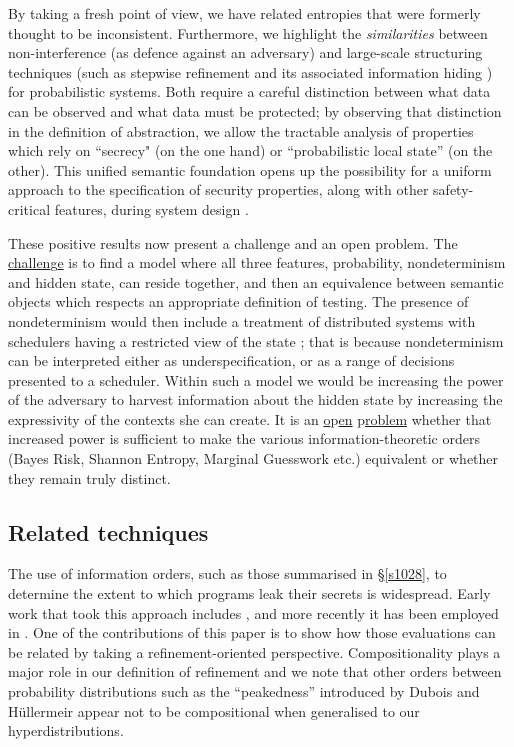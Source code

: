 \documentclass[runningheads]{llncs}
\newcommand\Sec[1] {Sec.~\ref{#1}}
\renewcommand\Sec[1] {\S\ref{#1}}
\begin{document}
By taking a fresh point of view, we have related entropies that were formerly thought to be inconsistent.
Furthermore, we highlight the \emph{similarities} between non-interference (as defence against an adversary) and large-scale structuring techniques (such as stepwise refinement and its associated information hiding \cite{Parnas:72}) for probabilistic systems. Both require a careful distinction between what data can be observed and what data must be protected; by observing that distinction in the definition of abstraction, we allow the tractable analysis of properties which rely on ``secrecy" (on the one hand) or ``probabilistic local state'' (on the other). This unified semantic foundation opens up the possibility for a uniform approach to the specification of security properties, along with other safety-critical features, during system design \cite{McIver:09f}.

These positive results now present a challenge and an open problem. The \underline{challen}g\underline{e} is to find a model where all three features, probability, nondeterminism and hidden state, can reside together, and then an equivalence between semantic objects which respects an appropriate definition of testing. The presence of nondeterminism would then include a treatment of distributed systems with schedulers having a restricted view of the state \cite{Chatzikokolakis:10}; that is because nondeterminism can be interpreted either as underspecification, or as a range of decisions presented to a scheduler.  Within such a model we would be increasing the power of the adversary  to harvest information about the hidden state by increasing the expressivity of the contexts she can create. It is an \underline{o}p\underline{en} p\underline{roblem} whether that increased power is sufficient to  make the various information-theoretic orders (Bayes Risk, Shannon Entropy, Marginal Guesswork etc.) equivalent or whether they remain truly distinct. 



\subsection*{Related techniques}

The use of information orders, such as those summarised in \Sec{s1028}, to determine the extent to which programs leak their secrets is widespread. Early work that took this approach includes  \cite{Millen:87,Wittbold:90,Gray:91}, and more recently it has been employed in \cite{Smith:07,Kopf:07,Braun:08,Clarkson:09,Malacaria:10}.
One of the contributions of this paper is to show how those evaluations can be related by taking a refinement-oriented perspective. Compositionality plays a major role in our definition of refinement and we note that other orders between probability distributions such as  the ``peakedness'' introduced by Dubois and H\"ullermeir  \cite{Dubois:05} appear not to be compositional when generalised to our hyperdistributions.
\end{document}
